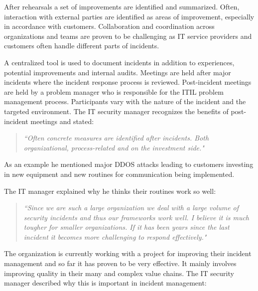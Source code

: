 After rehearsals a set of improvements are identified and summarized. Often, interaction with external parties are identified as areas of improvement, especially in accordance with customers. Collaboration and coordination across organizations and teams are proven to be challenging as IT service providers and customers often handle different parts of incidents. 

A centralized tool is used to document incidents in addition to experiences, potential improvements and internal audits. Meetings are held after major incidents where the incident response process is reviewed. Post-incident meetings are held by a problem manager who is responsible for the ITIL problem management process. Participants vary with the nature of the incident and the targeted environment. The IT security manager recognizes the benefits of post-incident meetings and stated:

\begin{quote}
\textit{``Often concrete measures are identified after incidents. Both organizational, process-related and on the investment side."}
\end{quote}

As an example he mentioned major DDOS attacks leading to customers investing in new equipment and new routines for communication being implemented. 


The IT manager explained why he thinks their routines work so well:

\begin{quote}
\textit{``Since we are such a large organization we deal with a large volume of security incidents and thus our frameworks work well. I believe it is much tougher for smaller organizations. If it has been years since the last incident it becomes more challenging to respond effectively."}
\end{quote}

The organization is currently working with a project for improving their incident management and so far it has proven to be very effective. It mainly involves improving quality in their many and complex value chains. The IT security manager described why this is important in incident management:

